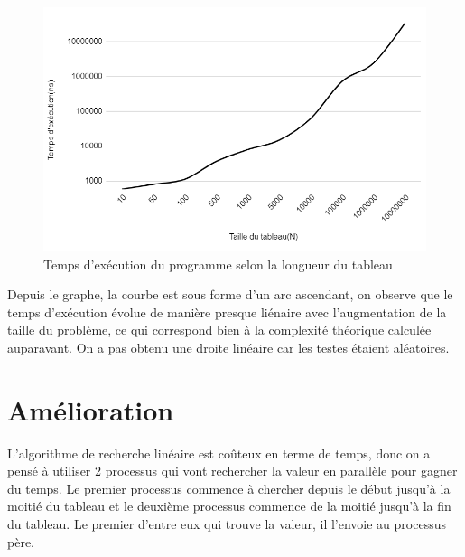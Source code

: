 \begin{figure}[H]
    \centering
        \includegraphics[scale=0.5]{./ressources/graphe_temps_execution.png}
        \caption{Temps d'exécution du programme selon la longueur du tableau}
    \label{fig:temps_exec_seq}
\end{figure}
\par
Depuis le graphe, la courbe est sous forme d'un arc ascendant, on observe que le temps d'exécution évolue de manière presque liénaire avec l'augmentation de la taille du problème, ce qui correspond bien à la complexité théorique calculée auparavant.
On a pas obtenu une droite linéaire car les testes étaient aléatoires.
\section{Amélioration}
L'algorithme de recherche linéaire est coûteux en terme de temps, donc on a pensé à utiliser 2 processus qui vont rechercher la valeur en parallèle pour gagner du temps.
Le premier processus commence à chercher depuis le début jusqu'à la moitié du tableau et le deuxième processus commence de la moitié jusqu'à la fin du tableau. Le premier d'entre eux qui trouve la valeur, il l'envoie au processus père.






